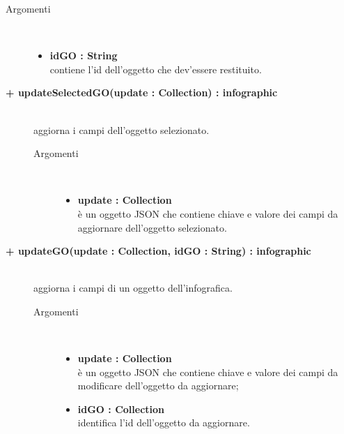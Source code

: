 \begin{description}
\begin{description}
\begin{description}
			\item[Argomenti] \hfill \\
				\begin{itemize}
						\item \textbf{idGO : String			} \hfill \\
					contiene l'id dell'oggetto che dev'essere restituito.
				\end{itemize}

\end{description}

\end{description}

\begin{description}
		\item[\textbf{\color{blue}+ updateSelectedGO(update : Collection) : infographic			}] \hfill \\
			aggiorna i campi dell'oggetto selezionato.   

\begin{description}
			\item[Argomenti] \hfill \\
				\begin{itemize}
						\item \textbf{update : Collection			} \hfill \\
					è un oggetto JSON che contiene chiave e valore dei campi da aggiornare dell'oggetto selezionato.
				\end{itemize}

\end{description}

\end{description}

\begin{description}
		\item[\textbf{\color{blue}+ updateGO(update : Collection, idGO : String) : infographic			}] \hfill \\
			aggiorna i campi di un oggetto dell'infografica.   

\begin{description}
			\item[Argomenti] \hfill \\
				\begin{itemize}
						\item \textbf{update : Collection			} \hfill \\
					è un oggetto JSON che contiene chiave e valore dei campi da modificare dell'oggetto da aggiornare;
					\item \textbf{idGO : Collection			} \hfill \\
					identifica l'id dell'oggetto da aggiornare.
				\end{itemize}


\end{description}
\end{description}
\end{description}
